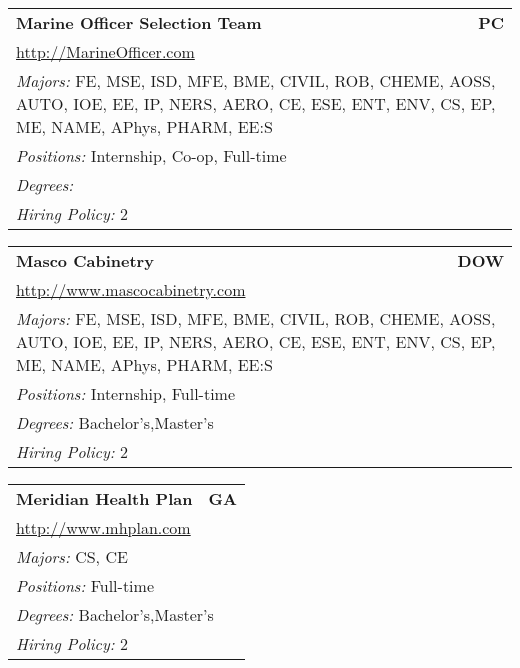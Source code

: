 \documentclass[twoside]{article}
\begin{document}
\begin{center}
\begin{multicols}{3}
\begin{FlushLeft}
\begin{minipage}{.9\columnwidth}\begin{tabularx}{.95\columnwidth}{Xr}
                 {\Large\bf Marine Officer Selection Team} & {\Large\bf PC}\\
    \multicolumn{2}{p{.95\columnwidth}}{\url{http://MarineOfficer.com}}\\
    \multicolumn{2}{p{.95\columnwidth}}{\emph{Majors:} FE, MSE, ISD, MFE, BME, CIVIL, ROB, CHEME, AOSS, AUTO, IOE, EE, IP, NERS, AERO, CE, ESE, ENT, ENV, CS, EP, ME, NAME, APhys, PHARM, EE:S}\\
    \multicolumn{2}{p{.95\columnwidth}}{\emph{Positions:} Internship, Co-op, Full-time}\\
    \multicolumn{2}{p{.95\columnwidth}}{\emph{Degrees:} }\\
    \multicolumn{2}{p{.95\columnwidth}}{\emph{Hiring Policy:} 2}\\
    \end{tabularx}
    
\end{minipage}
 
\begin{minipage}{.9\columnwidth}\begin{tabularx}{.95\columnwidth}{Xr}
                 {\Large\bf Masco Cabinetry} & {\Large\bf DOW}\\
    \multicolumn{2}{p{.95\columnwidth}}{\url{http://www.mascocabinetry.com}}\\
    \multicolumn{2}{p{.95\columnwidth}}{\emph{Majors:} FE, MSE, ISD, MFE, BME, CIVIL, ROB, CHEME, AOSS, AUTO, IOE, EE, IP, NERS, AERO, CE, ESE, ENT, ENV, CS, EP, ME, NAME, APhys, PHARM, EE:S}\\
    \multicolumn{2}{p{.95\columnwidth}}{\emph{Positions:} Internship, Full-time}\\
    \multicolumn{2}{p{.95\columnwidth}}{\emph{Degrees:} Bachelor's,Master's}\\
    \multicolumn{2}{p{.95\columnwidth}}{\emph{Hiring Policy:} 2}\\
    \end{tabularx}
    
\end{minipage}
 
\begin{minipage}{.9\columnwidth}\begin{tabularx}{.95\columnwidth}{Xr}
                 {\Large\bf Meridian Health Plan} & {\Large\bf GA}\\
    \multicolumn{2}{p{.95\columnwidth}}{\url{http://www.mhplan.com}}\\
    \multicolumn{2}{p{.95\columnwidth}}{\emph{Majors:} CS, CE}\\
    \multicolumn{2}{p{.95\columnwidth}}{\emph{Positions:} Full-time}\\
    \multicolumn{2}{p{.95\columnwidth}}{\emph{Degrees:} Bachelor's,Master's}\\
    \multicolumn{2}{p{.95\columnwidth}}{\emph{Hiring Policy:} 2}\\
    \end{tabularx}
    

\end{minipage}
\end{FlushLeft}
\end{multicols}
\end{center}
\end{document}
